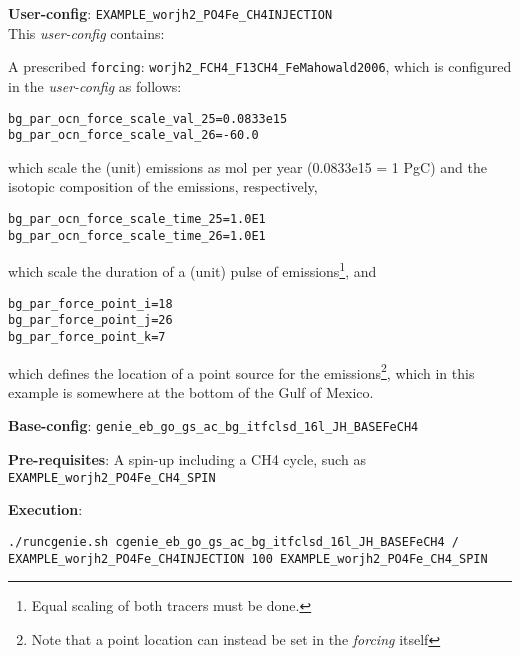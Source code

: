 \documentclass[10pt,twoside]{article}
\begin{document}
\noindent \textbf{User-config}: \texttt{EXAMPLE\_worjh2\_PO4Fe\_CH4INJECTION}
\\ This \textit{user-config} contains:
\begin{compactitem}
        \item A prescribed \texttt{forcing}: \texttt{worjh2\_FCH4\_F13CH4\_FeMahowald2006}, which is configured in the \textit{user-config} as follows:
\begin{compactenum}
        \item 
        \begin{verbatim}
bg_par_ocn_force_scale_val_25=0.0833e15
bg_par_ocn_force_scale_val_26=-60.0
                \end{verbatim}
                which scale the (unit) emissions as mol per year (0.0833e15 = 1 PgC) and the isotopic composition of the emissions, respectively,
        \item 
        \begin{verbatim}
bg_par_ocn_force_scale_time_25=1.0E1
bg_par_ocn_force_scale_time_26=1.0E1
                \end{verbatim}
                which scale the duration of a (unit) pulse of emissions\footnote{Equal scaling of both tracers must be done.}, and
        \item 
        \begin{verbatim}
bg_par_force_point_i=18
bg_par_force_point_j=26
bg_par_force_point_k=7
                \end{verbatim}
                which defines the location of a point source for the emissions\footnote{Note that a point location can instead be set in the \textit{forcing} itself}, which in this example is somewhere at the bottom of the Gulf of Mexico.
\end{compactenum}
\end{compactitem}

\noindent \textbf{Base-config}: \texttt{genie\_eb\_go\_gs\_ac\_bg\_itfclsd\_16l\_JH\_BASEFeCH4}

\noindent \textbf{Pre-requisites}: A spin-up including a CH4 cycle, such as \texttt{EXAMPLE\_worjh2\_PO4Fe\_CH4\_SPIN}

\noindent \textbf{Execution}:
\vspace{-10pt}\begin{verbatim}
./runcgenie.sh cgenie_eb_go_gs_ac_bg_itfclsd_16l_JH_BASEFeCH4 / 
EXAMPLE_worjh2_PO4Fe_CH4INJECTION 100 EXAMPLE_worjh2_PO4Fe_CH4_SPIN
                \end{verbatim}
\end{document}
